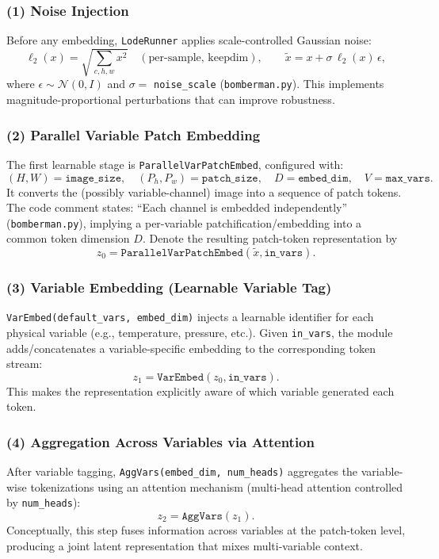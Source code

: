 \documentclass{article} %
\begin{document}
\subsubsection{(1) Noise Injection}
\label{subsec:noise}
Before any embedding, \texttt{LodeRunner} applies scale-controlled Gaussian noise:
\[
\ell_2(x) = \sqrt{\sum_{c,h,w} x^2}\quad (\text{per-sample, keepdim}), \qquad
\tilde{x} = x + \sigma \,\ell_2(x)\,\epsilon,
\]
where $\epsilon \sim \mathcal{N}(0, I)$ and $\sigma=$ \texttt{noise\_scale} (\texttt{bomberman.py}). This implements magnitude-proportional perturbations that can improve robustness.

\subsubsection{(2) Parallel Variable Patch Embedding}
\label{subsec:parallel_patch_embed}
The first learnable stage is \texttt{ParallelVarPatchEmbed}, configured with:
\[
(H, W)=\texttt{image\_size},\quad (P_h,P_w)=\texttt{patch\_size},\quad D=\texttt{embed\_dim},\quad V=\texttt{max\_vars}.
\]
It converts the (possibly variable-channel) image into a sequence of patch tokens. The code comment states: ``Each channel is embedded independently'' (\texttt{bomberman.py}), implying a per-variable patchification/embedding into a common token dimension $D$. Denote the resulting patch-token representation by
\[
z_0 = \texttt{ParallelVarPatchEmbed}(\tilde{x}, \texttt{in\_vars}).
\]

\subsubsection{(3) Variable Embedding (Learnable Variable Tag)}
\label{subsec:var_embed}
\texttt{VarEmbed(default\_vars, embed\_dim)} injects a learnable identifier for each physical variable (e.g., temperature, pressure, etc.). Given \texttt{in\_vars}, the module adds/concatenates a variable-specific embedding to the corresponding token stream:
\[
z_1 = \texttt{VarEmbed}(z_0, \texttt{in\_vars}).
\]
This makes the representation explicitly aware of which variable generated each token.

\subsubsection{(4) Aggregation Across Variables via Attention}
\label{subsec:aggvars}
After variable tagging, \texttt{AggVars(embed\_dim, num\_heads)} aggregates the variable-wise tokenizations using an attention mechanism (multi-head attention controlled by \texttt{num\_heads}):
\[
z_2 = \texttt{AggVars}(z_1).
\]
Conceptually, this step fuses information across variables at the patch-token level, producing a joint latent representation that mixes multi-variable context.
\end{document}
